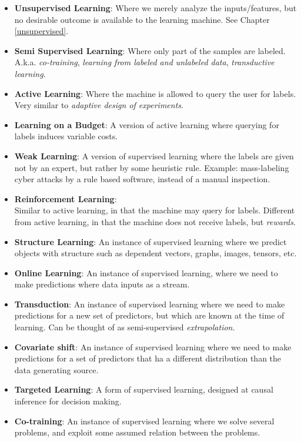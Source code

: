 \documentclass[]{book}
\theoremstyle{definition}
\theoremstyle{definition}
\theoremstyle{definition}
\theoremstyle{remark}
\begin{document}
\begin{itemize}
\item
  \textbf{Unsupervised Learning}:
  Where we merely analyze the inputs/features, but no desirable outcome is available to the learning machine.
  See Chapter \ref{unsupervised}.
\item
  \textbf{Semi Supervised Learning}:
  Where only part of the samples are labeled.
  A.k.a. \emph{co-training}, \emph{learning from labeled and unlabeled data}, \emph{transductive learning}.
\item
  \textbf{Active Learning}:
  Where the machine is allowed to query the user for labels. Very similar to \emph{adaptive design of experiments}.
\item
  \textbf{Learning on a Budget}:
  A version of active learning where querying for labels induces variable costs.
\item
  \textbf{Weak Learning}:
  A version of supervised learning where the labels are given not by an expert, but rather by some heuristic rule.
  Example: mass-labeling cyber attacks by a rule based software, instead of a manual inspection.
\item
  \textbf{Reinforcement Learning}:\\
  Similar to active learning, in that the machine may query for labels.
  Different from active learning, in that the machine does not receive labels, but \emph{rewards}.
\item
  \textbf{Structure Learning}:
  An instance of supervised learning where we predict objects with structure such as dependent vectors, graphs, images, tensors, etc.
\item
  \textbf{Online Learning}:
  An instance of supervised learning, where we need to make predictions where data inputs as a stream.
\item
  \textbf{Transduction}:
  An instance of supervised learning where we need to make predictions for a new set of predictors, but which are known at the time of learning.
  Can be thought of as semi-supervised \emph{extrapolation}.
\item
  \textbf{Covariate shift}:
  An instance of supervised learning where we need to make predictions for a set of predictors that ha a different distribution than the data generating source.
\item
  \textbf{Targeted Learning}:
  A form of supervised learning, designed at causal inference for decision making.
\item
  \textbf{Co-training}:
  An instance of supervised learning where we solve several problems, and exploit some assumed relation between the problems.

\end{itemize}
\end{document}
